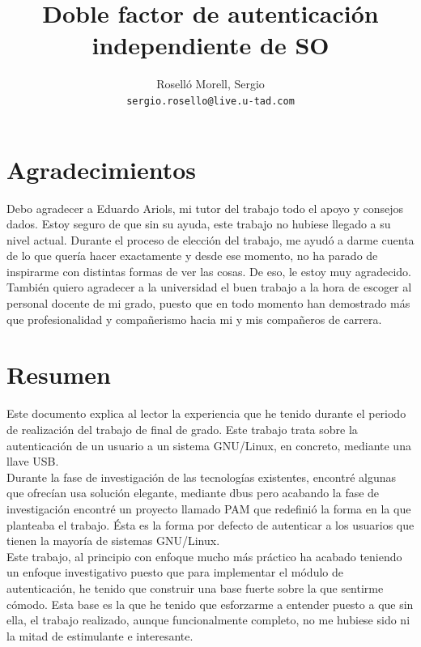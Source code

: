 \documentclass[titlepage]{article}
\title{Doble factor de autenticación independiente de SO}
\author{Roselló Morell, Sergio\\
\texttt{sergio.rosello@live.u-tad.com}}
\begin{document}
\maketitle
\tableofcontents
\clearpage
\section{Agradecimientos}
Debo agradecer a Eduardo Ariols, mi tutor del trabajo todo el apoyo y consejos dados. Estoy seguro de que sin su ayuda, este trabajo no hubiese llegado a su nivel actual. Durante el proceso de elección del trabajo, me ayudó a darme cuenta de lo que quería hacer exactamente y desde ese momento, no ha parado de inspirarme con distintas formas de ver las cosas. De eso, le estoy muy agradecido.\\También quiero agradecer a la universidad el buen trabajo a la hora de escoger al personal docente de mi grado, puesto que en todo momento han demostrado más que profesionalidad y compañerismo hacia mi y mis compañeros de carrera.
\clearpage
\section{Resumen}
Este documento explica al lector la experiencia que he tenido durante el periodo de realización del trabajo de final de grado. Este trabajo trata sobre la autenticación de un usuario a un sistema \Gls{GNU/Linux}, en concreto, mediante una llave \Gls{USB}.\\Durante la fase de investigación de las tecnologías existentes, encontré algunas que ofrecían usa solución elegante, mediante \Gls{dbus} pero acabando la fase de investigación encontré un proyecto llamado \Gls{PAM} que redefinió la forma en la que planteaba el trabajo. Ésta es la forma por defecto de autenticar a los usuarios que tienen la mayoría de sistemas \Gls{GNU/Linux}.\\Este trabajo, al principio con enfoque mucho más práctico ha acabado teniendo un enfoque investigativo puesto que para implementar el módulo de autenticación, he tenido que construir una base fuerte sobre la que sentirme cómodo. Esta base es la que he tenido que esforzarme a entender puesto a que sin ella, el trabajo realizado, aunque funcionalmente completo, no me hubiese sido ni la mitad de estimulante e interesante.
\end{document}
